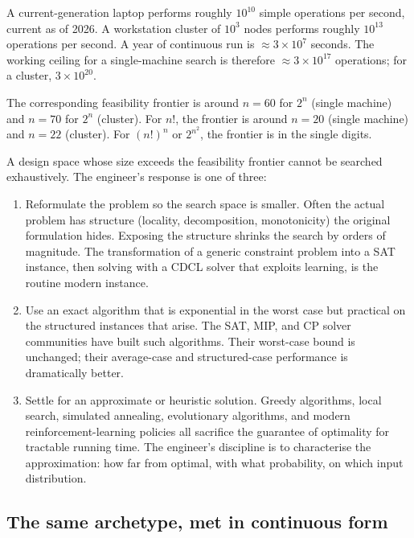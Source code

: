 A current-generation laptop performs roughly $10^{10}$ simple
operations per second, current as of 2026. A workstation cluster of
$10^{3}$ nodes performs roughly $10^{13}$ operations per second. A
year of continuous run is $\approx 3 \times 10^{7}$ seconds. The
working ceiling for a single-machine search is therefore $\approx 3
\times 10^{17}$ operations; for a cluster, $3 \times 10^{20}$.

The corresponding feasibility frontier is around $n = 60$ for
$2^{n}$ (single machine) and $n = 70$ for $2^{n}$ (cluster). For
$n!$, the frontier is around $n = 20$ (single machine) and $n = 22$
(cluster). For $(n!)^{n}$ or $2^{n^{2}}$, the frontier is in the
single digits.

A design space whose size exceeds the feasibility frontier cannot
be searched exhaustively. The engineer's response is one of three:

\begin{enumerate}[leftmargin=*]
  \item Reformulate the problem so the search space is smaller.
    Often the actual problem has structure (locality, decomposition,
    monotonicity) the original formulation hides. Exposing the
    structure shrinks the search by orders of magnitude. The
    transformation of a generic constraint problem into a SAT
    instance, then solving with a CDCL solver that exploits
    learning, is the routine modern instance.
  \item Use an exact algorithm that is exponential in the worst
    case but practical on the structured instances that arise. The
    SAT, MIP, and CP solver communities have built such algorithms.
    Their worst-case bound is unchanged; their average-case and
    structured-case performance is dramatically better.
  \item Settle for an approximate or heuristic solution. Greedy
    algorithms, local search, simulated annealing, evolutionary
    algorithms, and modern reinforcement-learning policies all
    sacrifice the guarantee of optimality for tractable running
    time. The engineer's discipline is to characterise the
    approximation: how far from optimal, with what probability, on
    which input distribution.
\end{enumerate}

\subsection{The same archetype, met in continuous form}

